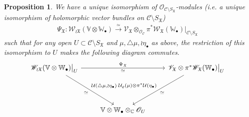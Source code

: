 \documentclass[12pt,a4paper,notitlepage]{article}
\theoremstyle{definition}
\theoremstyle{plain}
\newtheorem{pp}[df]{Proposition}
\newcommand{\fk}{\mathfrak}
\newcommand{\mc}{\mathcal}
\newcommand{\scr}{\mathscr}
\newcommand{\SX}{{S_{\fk X}}}
\newcommand{\blt}{\bullet}
\newcommand{\Vbb}{\mathbb V}
\newcommand{\Wbb}{\mathbb W}
\newcommand{\Cbb}{\mathbb C}
\numberwithin{equation}{section}
\begin{document}
\begin{pp}\label{lb5}
We have a unique isomorphism of $\scr O_{\mc C\setminus\SX}$-modules (i.e. a unique isomorphism of holomorphic vector bundles on $\mc C\setminus\SX$)
\begin{align}
\Psi_{\fk X}:\scr W_{\wr\fk X}(\Vbb\otimes\Wbb_\blt)\xrightarrow{\simeq} \scr V_{\fk X}\otimes_{\scr O_{\mc C}}\pi^*\scr W_{\fk X}(\Wbb_\blt)\big|_{\mc C\setminus\SX}\label{eq32}	
\end{align}
such that for any open $U\subset\mc C\setminus\SX$ and $\mu,\triangle\mu,\wr\eta_\blt$ as above, the restriction of this isomorphism to $U$ makes the following diagram commutes.
\begin{equation}
\begin{tikzcd}
\scr W_{\wr\fk X}(\Vbb\otimes\Wbb_\blt)\big|_U \arrow[rr,"\simeq"',"\Psi_{\fk X}"] \arrow[ddr, "\simeq"' ,"{\mc U(\triangle\mu,\wr\eta_\blt)}"]  && \scr V_{\fk X}\otimes\pi^*\scr W_{\fk X}(\Wbb_\blt)\big |_U \arrow[ddl,"\simeq","{\mc U_\varrho(\mu)\otimes\pi^*\mc U(\eta_\blt)}"']\\
{}\\
& \Vbb\otimes\Wbb_\blt\otimes_\Cbb \scr O_U
\end{tikzcd}\label{eq26}	
\end{equation}
\end{pp}
\end{document}
